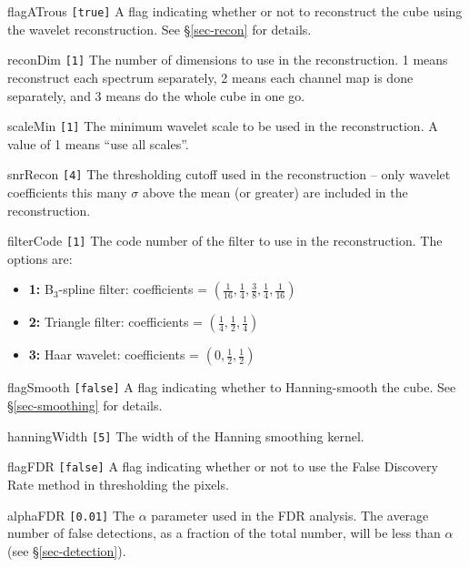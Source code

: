 \begin{entry}
\item [flagATrous \texttt{[true]}] A flag indicating whether or not to
  reconstruct the cube using the \atrous wavelet
  reconstruction. See \S\ref{sec-recon} for details.
\item[reconDim \texttt{[1]}] The number of dimensions to use in the
  reconstruction. 1 means reconstruct each spectrum separately, 2
  means each channel map is done separately, and 3 means do the whole
  cube in one go.
\item[scaleMin \texttt{[1]}] The minimum wavelet scale to be used in the
  reconstruction. A value of 1 means ``use all scales''.
\item[snrRecon \texttt{[4]}] The thresholding cutoff used in the
  reconstruction -- only wavelet coefficients this many $\sigma$ above
  the mean (or greater) are included in the reconstruction. 
\item[filterCode \texttt{[1]}] The code number of the filter to use in
  the reconstruction. The options are:
  \begin{itemize}
  \item \textbf{1:} B$_3$-spline filter: coefficients = 
    $(\frac{1}{16}, \frac{1}{4}, \frac{3}{8}, \frac{1}{4}, \frac{1}{16})$
  \item \textbf{2:} Triangle filter: coefficients = 
    $(\frac{1}{4}, \frac{1}{2}, \frac{1}{4})$
  \item \textbf{3:} Haar wavelet: coefficients = 
    $(0, \frac{1}{2}, \frac{1}{2})$
  \end{itemize}
\end{entry}

\begin{entry}
\item [flagSmooth \texttt{[false]}] A flag indicating whether to
  Hanning-smooth the cube. See \S\ref{sec-smoothing} for details.
\item [hanningWidth \texttt{[5]}] The width of the Hanning smoothing
kernel. 
\end{entry}

\begin{entry}
\item[flagFDR \texttt{[false]}] A flag indicating whether or not to use
  the False Discovery Rate method in thresholding the pixels.
\item[alphaFDR \texttt{[0.01]}] The $\alpha$ parameter used in the FDR
analysis. The average number of false detections, as a fraction of the
total number, will be less than $\alpha$ (see \S\ref{sec-detection}).
\end{entry}

